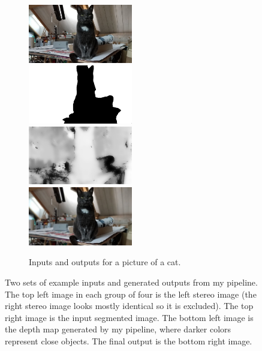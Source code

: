 \documentclass{article}
\begin{document}
\begin{figure}
    \begin{subfigure}{\textwidth}
        \includegraphics[width=0.5\textwidth]{../data/cat2-left}
        \includegraphics[width=0.5\textwidth]{../data/cat2-seg-clean}
        \includegraphics[width=0.5\textwidth]{../output/cat2-depth}
        \includegraphics[width=0.5\textwidth]{../output/cat2-portrait}
        \caption{Inputs and outputs for a picture of a cat.}
    \end{subfigure}

    \caption{Two sets of example inputs and generated outputs from my pipeline. The top left image in each group of four is the left stereo image
    (the right stereo image looks mostly identical so it is excluded). The top right image is the input segmented image. The bottom left image is
    the depth map generated by my pipeline, where darker colors represent close objects. The final output is the bottom right image.}
    \label{fig:ios}
\end{figure}
\end{document}
